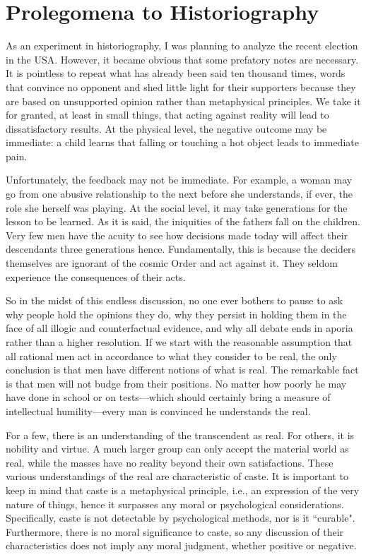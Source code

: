 \section{Prolegomena to Historiography}

As an experiment in historiography, I was planning to analyze the recent election in the USA. However, it became obvious that some prefatory notes are necessary. It is pointless to repeat what has already been said ten thousand times, words that convince no opponent and shed little light for their supporters because they are based on unsupported opinion rather than metaphysical principles. We take it for granted, at least in small things, that acting against reality will lead to dissatisfactory results. At the physical level, the negative outcome may be immediate: a child learns that falling or touching a hot object leads to immediate pain.

Unfortunately, the feedback may not be immediate. For example, a woman may go from one abusive relationship to the next before she understands, if ever, the role she herself was playing. At the social level, it may take generations for the lesson to be learned. As it is said, the iniquities of the fathers fall on the children. Very few men have the acuity to see how decisions made today will affect their descendants three generations hence. Fundamentally, this is because the deciders themselves are ignorant of the cosmic Order and act against it. They seldom experience the consequences of their acts.

So in the midst of this endless discussion, no one ever bothers to pause to ask why people hold the opinions they do, why they persist in holding them in the face of all illogic and counterfactual evidence, and why all debate ends in aporia rather than a higher resolution. If we start with the reasonable assumption that all rational men act in accordance to what they consider to be real, the only conclusion is that men have different notions of what is real. The remarkable fact is that men will not budge from their positions. No matter how poorly he may have done in school or on tests—which should certainly bring a measure of intellectual humility—every man is convinced he understands the real.

For a few, there is an understanding of the transcendent as real. For others, it is nobility and virtue. A much larger group can only accept the material world as real, while the masses have no reality beyond their own satisfactions. These various understandings of the real are characteristic of caste. It is important to keep in mind that caste is a metaphysical principle, i.e., an expression of the very nature of things, hence it surpasses any moral or psychological considerations. Specifically, caste is not detectable by psychological methods, nor is it ``curable". Furthermore, there is no moral significance to caste, so any discussion of their characteristics does not imply any moral judgment, whether positive or negative.


